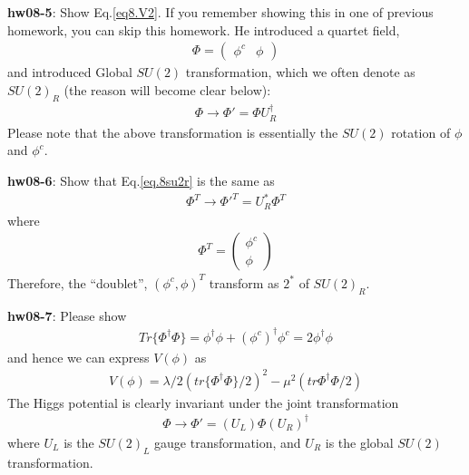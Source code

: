\documentclass[12pt]{article}
\begin{document}
{\bf hw08-5}: Show Eq.\ref{eq8.V2}. If you remember showing this in one of previous homework, you can skip this homework. He introduced a quartet field,
\begin{eqnarray}
  \Phi = 
  \begin{pmatrix}
    \phi^c&\phi
  \end{pmatrix} \label{eq.8quarfild}
\end{eqnarray}
  and introduced Global $SU(2)$ transformation, which we often denote
  as $SU(2)_R$ (the reason will become clear below):
  \begin{eqnarray}
    \Phi \to \Phi' = \Phi U_R^\dagger \label{eq.8su2r}
  \end{eqnarray}
  Please note that the above transformation is essentially the $SU(2)$
  rotation of $\phi$ and $\phi^c$.

{\bf hw08-6}: Show that Eq.\ref{eq.8su2r} is the same as
\begin{eqnarray}
  \Phi^T \to \Phi'^T = U_R^* \Phi^T
\end{eqnarray}
 where
\begin{eqnarray}
  \Phi^T = 
  \begin{pmatrix}
    \phi^c \\  \phi
  \end{pmatrix}
\end{eqnarray}
  Therefore, the ``doublet'', $( \phi^c, \phi )^T$ transform as
  $2^*$ of $SU(2)_R$.

{\bf hw08-7}:
  Please show
\begin{eqnarray}
  Tr\{ \Phi^\dagger \Phi \}
    = \phi^\dagger \phi + (\phi^c)^\dagger \phi^c
    = 2 \phi^\dagger \phi
\end{eqnarray}
   and hence we can express $V(\phi)$ as
\begin{eqnarray}
  V(\phi) = \lambda/2 ( tr\{ \Phi^\dagger \Phi \}/2 )^2
                   -\mu^2 ( tr{ \Phi^\dagger \Phi }/2 )
\end{eqnarray}
  The Higgs potential is clearly invariant under the joint transformation
\begin{eqnarray}
  \Phi \to \Phi' = (U_L) \Phi (U_R)^\dagger \label{eq.8joitran}
\end{eqnarray}
 where $U_L$ is the $SU(2)_L$ gauge transformation, and
  $U_R$ is the global $SU(2)$ transformation.
\end{document}
